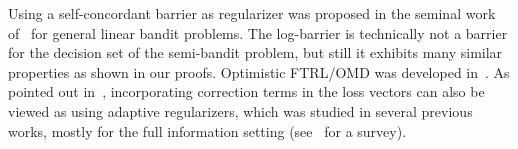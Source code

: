Using a self-concordant barrier as regularizer was proposed in the seminal work of~\citep{abernethy2008competing} for general linear bandit problems.
The log-barrier is technically not a barrier for the decision set of the semi-bandit problem, 
but still it exhibits many similar properties as shown in our proofs.
Optimistic FTRL/OMD was developed in~\citep{chiang2012online, rakhlin2013online}.
As pointed out in~\citep{steinhardt2014adaptivity}, incorporating correction terms in the loss vectors can also be viewed as using adaptive regularizers,
which was studied in several previous works, mostly for the full information setting (see~\citep{mcmahan2017survey} for a survey).



